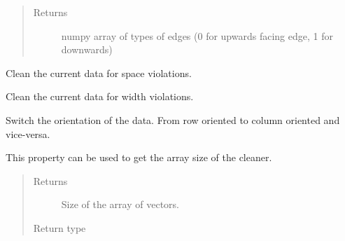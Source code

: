 \documentclass[a4paper,10pt,english]{sphinxmanual}
\begin{document}
\begin{fulllineitems}
\begin{fulllineitems}
\begin{quote}
\begin{description}
\item[{Returns}] \leavevmode
numpy array of types of edges (0 for upwards facing edge, 1 for downwards)

\end{description}\end{quote}

\end{fulllineitems}


\begin{fulllineitems}
\label{\detokenize{drc:drc.drc.slcleaner.PyDrcSl.clean_space}}
Clean the current data for space violations.

\end{fulllineitems}


\begin{fulllineitems}
\label{\detokenize{drc:drc.drc.slcleaner.PyDrcSl.clean_width}}
Clean the current data for width violations.

\end{fulllineitems}


\begin{fulllineitems}
\label{\detokenize{drc:drc.drc.slcleaner.PyDrcSl.switch_dimensions}}
Switch the orientation of the data. From row oriented to column oriented and vice-versa.

\end{fulllineitems}


\begin{fulllineitems}
\label{\detokenize{drc:drc.drc.slcleaner.PyDrcSl.s}}
This property can be used to get the array size of the cleaner.
\begin{quote}\begin{description}
\item[{Returns}] \leavevmode
Size of the array of vectors.

\item[{Return type}] \leavevmode
{}%
\begin{footnote}[10]\sphinxAtStartFootnote
{}
%
\end{footnote}


\end{description}
\end{quote}
\end{fulllineitems}
\end{fulllineitems}
\end{document}
